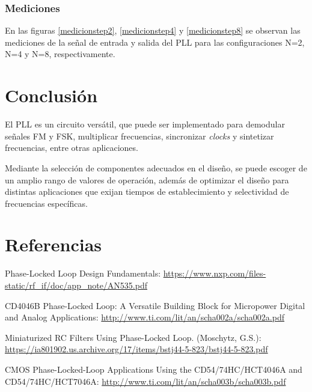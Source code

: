 \documentclass{article}
\begin{document}
\subsubsection{Mediciones}
En las figuras \ref{medicionstep2}, \ref{medicionstep4} y \ref{medicionstep8} se observan las mediciones de la señal de entrada y salida del PLL para las configuraciones N=2, N=4 y N=8, respectivamente.

\section{Conclusión}
El PLL es un circuito versátil, que puede ser implementado para demodular señales FM y FSK, multiplicar frecuencias, sincronizar \emph{clocks} y sintetizar frecuencias, entre otras aplicaciones.

Mediante la selección de componentes adecuados en el diseño, se puede escoger de un amplio rango de valores de operación, además de optimizar el diseño para distintas aplicaciones que exijan tiempos de establecimiento y selectividad de frecuencias específicas.

\section{Referencias}
Phase-Locked Loop Design Fundamentals: \url{https://www.nxp.com/files-static/rf_if/doc/app_note/AN535.pdf}

CD4046B Phase-Locked Loop: A Versatile Building
Block for Micropower Digital and Analog Applications: \url{http://www.ti.com/lit/an/scha002a/scha002a.pdf}

Miniaturized RC Filters Using Phase-Locked Loop. (Moschytz, G.S.): \url{https://ia801902.us.archive.org/17/items/bstj44-5-823/bstj44-5-823.pdf}

CMOS Phase-Locked-Loop Applications Using the
CD54/74HC/HCT4046A and CD54/74HC/HCT7046A: \url{http://www.ti.com/lit/an/scha003b/scha003b.pdf}
\end{document}
